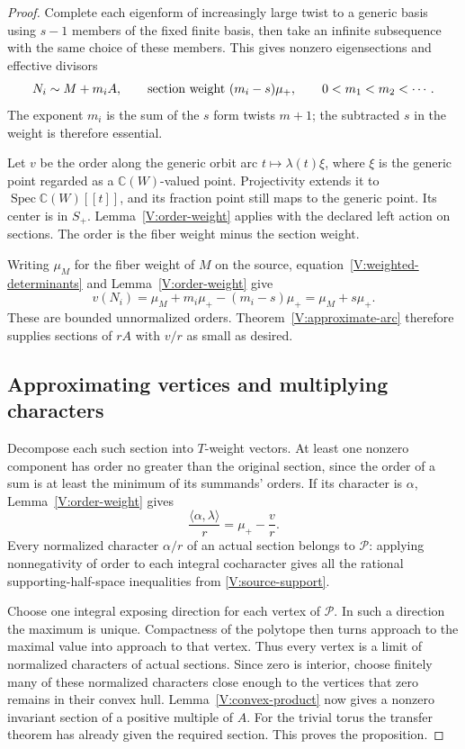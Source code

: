\begin{proof}
Complete each eigenform of increasingly large twist to a generic
basis using $s-1$ members of the fixed finite basis, then take an
infinite subsequence with the same choice of these members.  This
gives nonzero eigensections and effective divisors
\begin{equation}\label{V:weighted-determinants}
 N_i\sim M+m_iA,
 \qquad\hbox{section weight }(m_i-s)\mu_+,
 \qquad 0<m_1<m_2<\cdots.
\end{equation}
The exponent $m_i$ is the sum of the $s$ form twists $m+1$; the
subtracted $s$ in the weight is therefore essential.

Let $v$ be the order along the generic orbit arc
$t\mapsto\lambda(t)\xi$, where $\xi$ is the generic point regarded
as a $\mathbb C(W)$-valued point.  Projectivity extends it to
$\operatorname{Spec}\mathbb C(W)[[t]]$, and its fraction point still
maps to the generic point.  Its center is in $S_+$.
Lemma~\ref{V:order-weight} applies with the declared left action on
sections.  The order is the fiber weight minus the section weight.

Writing $\mu_M$ for the fiber weight of $M$ on the source, equation~\eqref{V:weighted-determinants} and Lemma~\ref{V:order-weight} give
\[
 v(N_i)=\mu_M+m_i\mu_+-(m_i-s)\mu_+
       =\mu_M+s\mu_+.
\]
These are bounded unnormalized orders.  Theorem~\ref{V:approximate-arc}
therefore supplies sections of $rA$ with $v/r$ as small as desired.

\subsection*{Approximating vertices and multiplying characters}

Decompose each such section into $T$-weight vectors.  At least one
nonzero component has order no greater than the original section,
since the order of a sum is at least the minimum of its summands'
orders.  If its character is $\alpha$, Lemma~\ref{V:order-weight} gives
\[
 \frac{\langle\alpha,\lambda\rangle}{r}
     =\mu_+-\frac{v}{r}.
\]
Every normalized character $\alpha/r$ of an actual section belongs
to $\mathcal P$: applying nonnegativity of order to each integral
cocharacter gives all the rational supporting-half-space inequalities
from \eqref{V:source-support}.

Choose one integral exposing direction for each vertex of
$\mathcal P$.  In such a direction the maximum is unique.  Compactness
of the polytope then turns approach to the maximal value into approach
to that vertex.  Thus every vertex is a limit of normalized characters
of actual sections.  Since zero is interior, choose finitely many
of these normalized characters close enough to the vertices that
zero remains in their convex hull.  Lemma~\ref{V:convex-product} now gives a nonzero invariant section
of a positive multiple of $A$.
For the trivial torus the transfer theorem has already given the
required section.  This proves the proposition.
\end{proof}
